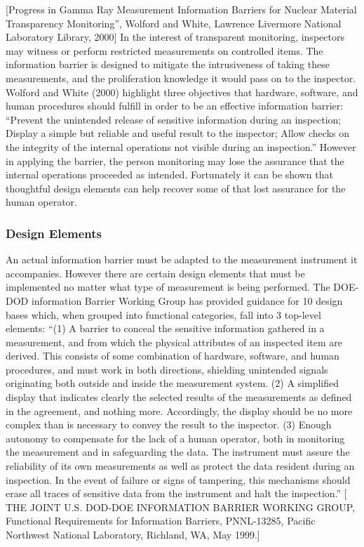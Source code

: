 \documentclass[a4paper]{article}
\begin{document}
[Progress in Gamma Ray Measurement Information Barriers for Nuclear Material 
Transparency Monitoring'', Wolford and White, Lawrence Livermore National 
Laboratory Library, 2000]
In the interest of transparent monitoring, inspectors may witness or perform 
restricted measurements on controlled items. The information barrier is designed 
to mitigate the intrusiveness of taking these measurements, and the proliferation 
knowledge it would pass on to the inspector. Wolford and White (2000) highlight 
three objectives that hardware, software, and human procedures should fulfill in 
order to be an effective information barrier:
``Prevent the unintended release of sensitive information during an inspection;
Display a simple but reliable and useful result to the inspector;
Allow checks on the integrity of the internal operations not visible during an inspection.''
However in applying the barrier, the person monitoring may lose the assurance 
that the internal operations proceeded as intended. Fortunately it can be shown 
that thoughtful design elements can help recover some of that lost assurance for 
the human operator.

\subsubsection{Design Elements}
An actual information barrier must be adapted to the measurement instrument it 
accompanies. However there are certain design elements that must be implemented 
no matter what type of measurement is being performed. The DOE-DOD information 
Barrier Working Group has provided guidance for 10 design bases which, when 
grouped into functional categories, fall into 3 top-level elements:
``(1) A barrier to conceal the sensitive information gathered in a measurement, 
and from which the physical attributes of an inspected item are derived. This 
consists of some combination of hardware, software, and human procedures, and 
must work in both directions, shielding unintended signals originating both 
outside and inside the measurement system.
(2) A simplified display that indicates clearly the selected results of the 
measurements as defined in the agreement, and nothing more. Accordingly, the 
display should be no more complex than is necessary to convey the result to the 
inspector.
(3) Enough autonomy to compensate for the lack of a human operator, both in 
monitoring the measurement and in safeguarding the data. The instrument must 
assure the reliability of its own measurements as well as protect the data 
resident during an inspection. In the event of failure or signs of tampering, 
this mechanisms should erase all traces of sensitive data from the instrument 
and halt the inspection.''
[ THE JOINT U.S. DOD-DOE INFORMATION BARRIER WORKING GROUP, Functional 
Requirements for Information Barriers, PNNL-13285, Pacific Northwest National 
Laboratory, Richland, WA, May 1999.]
\end{document}

